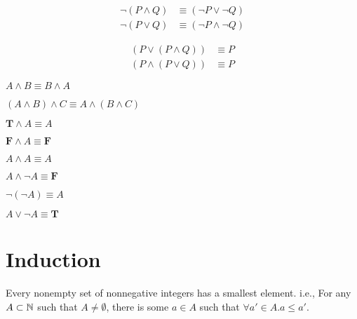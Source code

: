 \begin{axiom_appendix}
\begin{align*}
    \neg (P \wedge Q) &\equiv (\neg P \vee \neg Q) \\
    \neg (P \vee Q) &\equiv (\neg P \wedge \neg Q)
\end{align*}
\end{axiom_appendix}

\begin{axiom_appendix}
\begin{align*}
    (P \vee (P \wedge Q)) &\equiv P \\
    (P \wedge (P \vee Q)) &\equiv P
\end{align*}
\end{axiom_appendix}

\begin{axiom_appendix}
$A \wedge B \equiv B \wedge A$
\end{axiom_appendix}

\begin{axiom_appendix}
$(A \wedge B) \wedge C \equiv A \wedge (B \wedge C)$
\end{axiom_appendix}

\begin{axiom_appendix}
$\textbf{T} \wedge A \equiv A$
\end{axiom_appendix}

\begin{axiom_appendix}
$\textbf{F} \wedge A \equiv \textbf{F}$
\end{axiom_appendix}

\begin{axiom_appendix}
$A \wedge A \equiv A$
\end{axiom_appendix}

\begin{axiom_appendix}
$A \wedge \neg A \equiv \textbf{F}$
\end{axiom_appendix}

\begin{axiom_appendix}
$\neg (\neg A) \equiv A$
\end{axiom_appendix}

\begin{axiom_appendix}
$A \vee \neg A \equiv \textbf{T}$
\end{axiom_appendix}

\section*{Induction}
\begin{axiom_appendix}
Every nonempty set of nonnegative integers has a smallest element. i.e., For any $A \subset \mathbb{N}$ such that $A \neq \emptyset$, there is some $a \in A$ such that $\forall a' \in A.a\leq a'$.
\end{axiom_appendix}